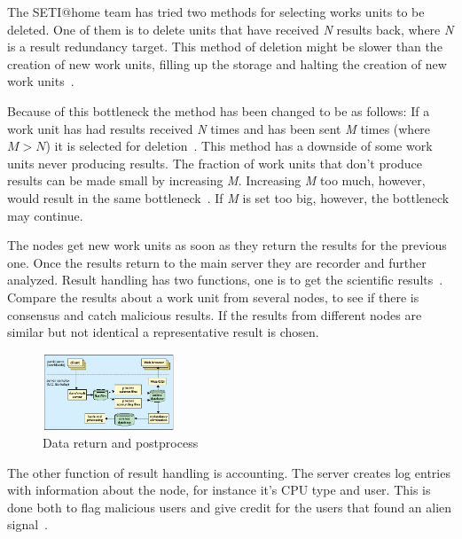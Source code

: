 The SETI$@$home team has tried two methods for selecting works units to be 
deleted. One of them is to delete units that have received \textit{N} results 
back,
where \textit{N} is a result redundancy target. This method of deletion might 
be slower than the creation of new work units, filling up the storage and 
halting the creation of new work 
units~\cite{hid-sp18-601-paper-anderson2002seti}.

Because of this bottleneck the method has been changed to be as follows: 
If a work unit has had results received \textit{N} times and has been sent 
\textit{M} times (where $M>N$) it is selected for 
deletion~\cite{hid-sp18-601-paper-anderson2002seti}. This method has 
a downside of some work units never producing results. The fraction of work
units that don't produce results can be made small by increasing \textit{M}. 
Increasing \textit{M} too much, however, would result in the same 
bottleneck~\cite{hid-sp18-601-paper-anderson2002seti}. If \textit{M} is set too 
big, however, the bottleneck may continue.

The nodes get new work units as soon as they return the results for the 
previous one. Once the results return to the main server they are recorder 
and further analyzed. Result handling has two functions, one is to 
get the scientific results~\cite{hid-sp18-601-paper-anderson2002seti}. 
Compare the results about a work unit from several nodes, to see if there 
is consensus and catch malicious results. 
If the results from different nodes are similar but not identical a 
representative result is chosen.

\begin{figure}[!htb]
        \centering
        \includegraphics[width=0.35\textwidth]{figures/data-return.jpg}
        \caption{Data return and 
        postprocess~\cite{hid-sp18-601-paper-anderson2002seti}}\label{datasend}
\end{figure}

The other function of result handling is accounting. The server creates 
log entries with information about the node, for instance it's CPU type and 
user. This is done both to flag malicious users and give credit for
the users that found an alien signal~\cite{hid-sp18-601-paper-anderson2002seti}.


